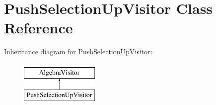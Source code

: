 \hypertarget{class_push_selection_up_visitor}{\section{Push\+Selection\+Up\+Visitor Class Reference}
\label{class_push_selection_up_visitor}
}
Inheritance diagram for Push\+Selection\+Up\+Visitor\+:\begin{figure}[H]
\begin{center}
\leavevmode
\includegraphics[height=2.000000cm]{class_push_selection_up_visitor}
\end{center}
\end{figure}
